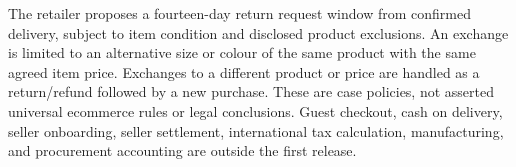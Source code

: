 The retailer proposes a fourteen-day return request window from confirmed delivery, subject to item condition and disclosed product exclusions. An exchange is limited to an alternative size or colour of the same product with the same agreed item price. Exchanges to a different product or price are handled as a return/refund followed by a new purchase. These are case policies, not asserted universal ecommerce rules or legal conclusions. Guest checkout, cash on delivery, seller onboarding, seller settlement, international tax calculation, manufacturing, and procurement accounting are outside the first release.
